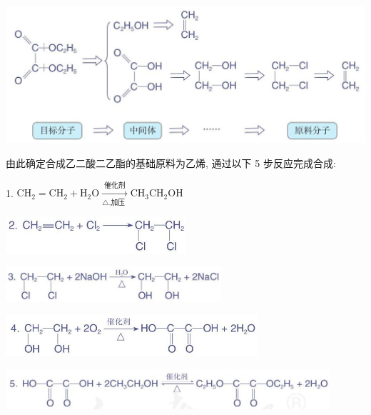 \documentclass[10pt]{article}
\begin{document}
\begin{center}
\includegraphics[max width=1.0\textwidth]{images/0190efc5-b58a-7c43-bfb0-e0a030df9cfd_94_374945.jpg}
\end{center}

由此确定合成乙二酸二乙酯的基础原料为乙烯, 通过以下 5 步反应完成合成:

1. \({\mathrm{{CH}}}_{2} = {\mathrm{{CH}}}_{2} + {\mathrm{H}}_{2}\mathrm{O}\xrightarrow[{\bigtriangleup \text{,加压 }}]{\text{ 催化剂 }}{\mathrm{{CH}}}_{3}{\mathrm{{CH}}}_{2}\mathrm{{OH}}\)

\begin{center}
\includegraphics[max width=0.5\textwidth]{images/0190efc5-b58a-7c43-bfb0-e0a030df9cfd_94_342854.jpg}
\end{center}

\begin{center}
\includegraphics[max width=0.6\textwidth]{images/0190efc5-b58a-7c43-bfb0-e0a030df9cfd_94_378934.jpg}
\end{center}

\begin{center}
\includegraphics[max width=0.7\textwidth]{images/0190efc5-b58a-7c43-bfb0-e0a030df9cfd_94_828507.jpg}
\end{center}

\begin{center}
\includegraphics[max width=0.9\textwidth]{images/0190efc5-b58a-7c43-bfb0-e0a030df9cfd_94_821208.jpg}
\end{center}
\end{document}
